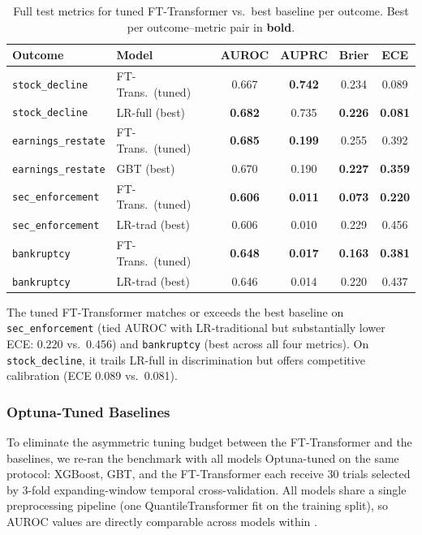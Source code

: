 \begin{table}[ht]
  \centering
  \caption{Full test metrics for tuned FT-Transformer vs.\ best baseline per outcome. Best per outcome--metric pair in \textbf{bold}.}
  \label{tab:full_metrics}
  \small
  \begin{tabular}{@{}llcccc@{}}
    \toprule
    Outcome & Model & AUROC & AUPRC & Brier & ECE \\
    \midrule
    \texttt{stock\_decline} & FT-Trans.\ (tuned) & 0.667 & \textbf{0.742} & 0.234 & 0.089 \\
    \texttt{stock\_decline} & LR-full (best) & \textbf{0.682} & 0.735 & \textbf{0.226} & \textbf{0.081} \\
    \midrule
    \texttt{earnings\_restate} & FT-Trans.\ (tuned) & \textbf{0.685} & \textbf{0.199} & 0.255 & 0.392 \\
    \texttt{earnings\_restate} & GBT (best) & 0.670 & 0.190 & \textbf{0.227} & \textbf{0.359} \\
    \midrule
    \texttt{sec\_enforcement} & FT-Trans.\ (tuned) & \textbf{0.606} & \textbf{0.011} & \textbf{0.073} & \textbf{0.220} \\
    \texttt{sec\_enforcement} & LR-trad (best) & 0.606 & 0.010 & 0.229 & 0.456 \\
    \midrule
    \texttt{bankruptcy} & FT-Trans.\ (tuned) & \textbf{0.648} & \textbf{0.017} & \textbf{0.163} & \textbf{0.381} \\
    \texttt{bankruptcy} & LR-trad (best) & 0.646 & 0.014 & 0.220 & 0.437 \\
    \bottomrule
  \end{tabular}
\end{table}

The tuned FT-Transformer matches or exceeds the best baseline on \texttt{sec\_enforcement} (tied AUROC with LR-traditional but substantially lower ECE: 0.220 vs.\ 0.456) and \texttt{bankruptcy} (best across all four metrics). On \texttt{stock\_decline}, it trails LR-full in discrimination but offers competitive calibration (ECE 0.089 vs.\ 0.081).

\subsubsection{Optuna-Tuned Baselines}
\label{sec:results_tuned}

To eliminate the asymmetric tuning budget between the FT-Transformer and the baselines, we re-ran the benchmark with all models Optuna-tuned on the same protocol: XGBoost, GBT, and the FT-Transformer each receive 30 trials selected by 3-fold expanding-window temporal cross-validation. All models share a single preprocessing pipeline (one QuantileTransformer fit on the training split), so AUROC values are directly comparable across models within .

